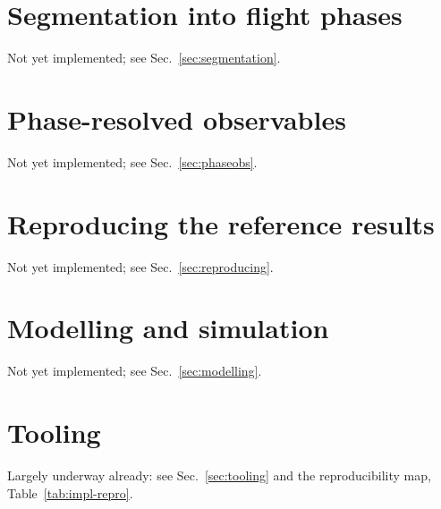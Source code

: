 \paragraph{} 

\section{Segmentation into flight phases}
\label{impl:segmentation}
Not yet implemented; see Sec.~\ref{sec:segmentation}.

\section{Phase-resolved observables}
\label{impl:phaseobs}
Not yet implemented; see Sec.~\ref{sec:phaseobs}.

\section{Reproducing the reference results}
\label{impl:reproducing}
Not yet implemented; see Sec.~\ref{sec:reproducing}.

\section{Modelling and simulation}
\label{impl:modelling}
Not yet implemented; see Sec.~\ref{sec:modelling}.

\section{Tooling}
\label{impl:tooling}
Largely underway already: see Sec.~\ref{sec:tooling} and the reproducibility map,
Table~\ref{tab:impl-repro}.

\stopcontents[impl]
